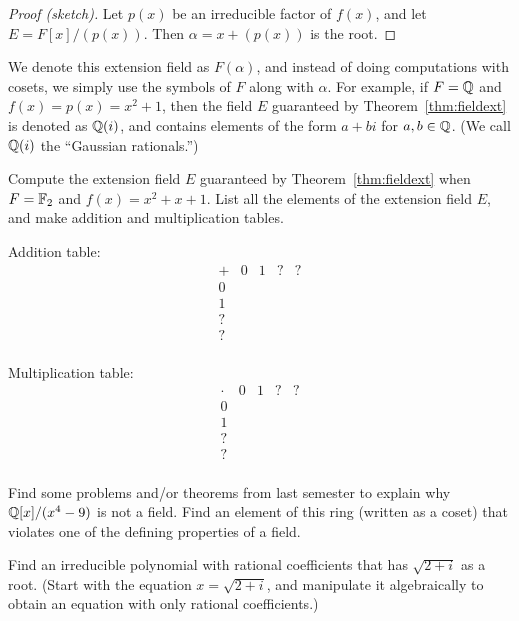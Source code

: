 \begin{proof}[Proof (sketch)]
    Let $p(x)$ be an irreducible factor of $f(x)$, and let $E=F[x]/(p(x))$. Then  $\alpha = x+(p(x))$ is the root.
\end{proof}

We denote this extension field as $F(\alpha)$, and instead of doing computations with cosets, we simply use the symbols of $F$ along with $\alpha$. For example, if $F = \mathbb{Q}$ and $f(x)=p(x)=x^2+1$, then the field $E$ guaranteed by Theorem~\ref{thm:fieldext} is denoted as $\mathbb{Q}(i)$, and contains elements of the form $a+bi$ for $a,b\in \mathbb{Q}$. (We call $\mathbb{Q}(i)$ the ``Gaussian rationals.'')

\begin{problem}
    Compute the extension field $E$ guaranteed by Theorem~\ref{thm:fieldext} when $F = \mathbb{F}_2$ and $f(x)=x^2+x+1$. List all the elements of the extension field $E$, and make addition and multiplication tables.
\end{problem}



Addition table:
\[
\begin{array}{c|cccc}
+   & 0   & 1  & ? & ? \\ \hline
0   &     &    &   &   \\
1   &     &    &   &   \\
?   &     &    &   &   \\
?   &     &    &   &   \\
\end{array}
\]

Multiplication table:
\[
\begin{array}{c|cccc}
\cdot & 0   & 1  & ? & ? \\ \hline
0     &     &    &   &   \\
1     &     &    &   &   \\
?     &     &    &   &   \\
?     &     &    &   &   \\
\end{array}
\]

\begin{problem}
    Find some problems and/or theorems from last semester to explain why $\mathbb{Q}[x]/(x^4-9)$ is not a field. Find an element of this ring (written as a coset) that violates one of the defining properties of a field.
\end{problem}



\begin{problem}
    Find an irreducible polynomial with rational coefficients that has $\sqrt{2+i}$ as a root. (Start with the equation $x=\sqrt{2+i}$, and manipulate it algebraically to obtain an equation with only rational coefficients.)
\end{problem}




